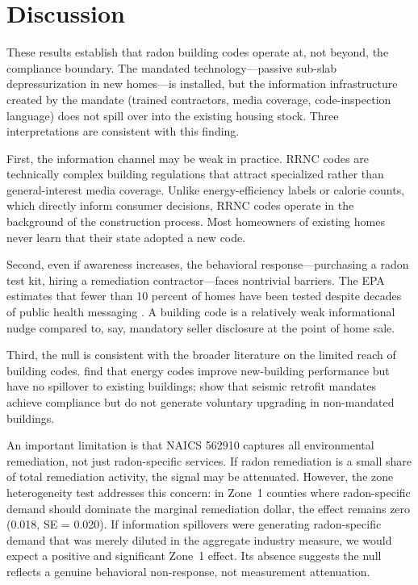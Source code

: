 \documentclass[12pt]{article}
\begin{document}
\section{Discussion}

These results establish that radon building codes operate at, not beyond, the compliance boundary. The mandated technology---passive sub-slab depressurization in new homes---is installed, but the information infrastructure created by the mandate (trained contractors, media coverage, code-inspection language) does not spill over into the existing housing stock. Three interpretations are consistent with this finding.

First, the information channel may be weak in practice. RRNC codes are technically complex building regulations that attract specialized rather than general-interest media coverage. Unlike energy-efficiency labels or calorie counts, which directly inform consumer decisions, RRNC codes operate in the background of the construction process. Most homeowners of existing homes never learn that their state adopted a new code.

Second, even if awareness increases, the behavioral response---purchasing a radon test kit, hiring a remediation contractor---faces nontrivial barriers. The EPA estimates that fewer than 10 percent of homes have been tested despite decades of public health messaging \citep{park2021radon}. A building code is a relatively weak informational nudge compared to, say, mandatory seller disclosure at the point of home sale.

Third, the null is consistent with the broader literature on the limited reach of building codes. \citet{jacobsen2016evaluating} find that energy codes improve new-building performance but have no spillover to existing buildings; \citet{bruegge2019efficiency} show that seismic retrofit mandates achieve compliance but do not generate voluntary upgrading in non-mandated buildings.

An important limitation is that NAICS 562910 captures all environmental remediation, not just radon-specific services. If radon remediation is a small share of total remediation activity, the signal may be attenuated. However, the zone heterogeneity test addresses this concern: in Zone~1 counties where radon-specific demand should dominate the marginal remediation dollar, the effect remains zero (0.018, SE = 0.020). If information spillovers were generating radon-specific demand that was merely diluted in the aggregate industry measure, we would expect a positive and significant Zone~1 effect. Its absence suggests the null reflects a genuine behavioral non-response, not measurement attenuation.
\end{document}
